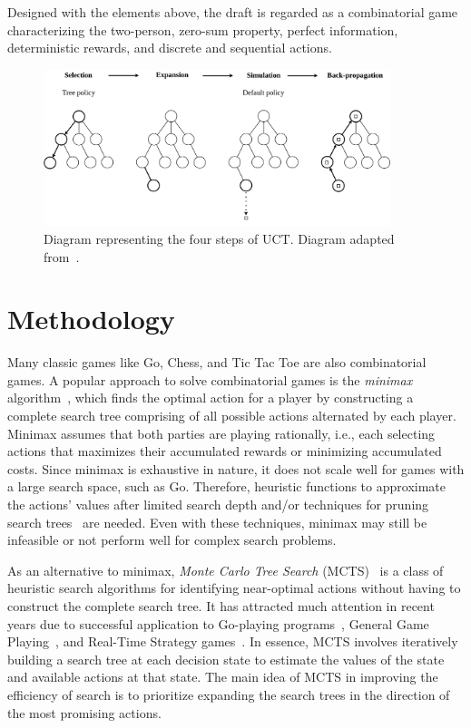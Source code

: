 Designed with the elements above, the draft is regarded as a combinatorial game characterizing the two-person, zero-sum property, perfect information, deterministic rewards, and discrete and sequential actions. 


\begin{figure}
\centering
\includegraphics[width=0.9\textwidth]{Figures/mcts_plot_my2.png}
\caption{Diagram representing the four steps of UCT. Diagram adapted from~\cite{browne2012survey}.}
\label{fig:mctsplot}
\end{figure}



\section{Methodology}\label{sec:mcts}
Many classic games like Go, Chess, and Tic Tac Toe are also combinatorial games. A popular approach to solve combinatorial games is the \textit{minimax} algorithm~\citep{knuth1975analysis}, which finds the optimal action for a player by constructing a complete search tree comprising of all possible actions alternated by each player. Minimax assumes that both parties are playing rationally, i.e., each selecting actions that maximizes their accumulated rewards or minimizing accumulated costs. Since minimax is exhaustive in nature, it does not scale well for games with a large search space, such as Go. Therefore, heuristic functions to approximate the actions' values after limited search depth and/or techniques for pruning search trees~\cite{knuth1975analysis} are needed. Even with these techniques, minimax may still be infeasible or not perform well for complex search problems. 


As an alternative to minimax, \textit{Monte Carlo Tree Search} (MCTS)~\citep{coulom2006efficient,kocsis2006bandit,nguyen2014bootstrapping} is a class of heuristic search algorithms for identifying near-optimal actions without having to construct the complete search tree. It has attracted much attention in recent years due to successful application to Go-playing programs~\citep{silver2016mastering,silver2017mastering}, General Game Playing~\citep{finnsson2008simulation}, and Real-Time Strategy games~\citep{balla2009uct}. In essence, MCTS involves iteratively building a search tree at each decision state to estimate the values of the state and available actions at that state. The main idea of MCTS in improving the efficiency of search is to prioritize expanding the search trees in the direction of the most promising actions.


